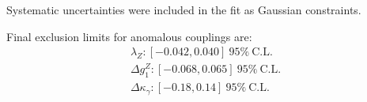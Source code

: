 

Systematic uncertainties were included in the fit as Gaussian
constraints.

Final exclusion limits for anomalous couplings are:
\begin{align}
  \lambda_{Z}: [-0.042,0.040]~95\%~\mathrm{C.L.}\\ 
  \Delta g^{Z}_1: [-0.068,0.065]~95\%~\mathrm{C.L.}\\
  \Delta\kappa_\gamma: [-0.18,0.14]~95\%~\mathrm{C.L.}\\
\end{align}

